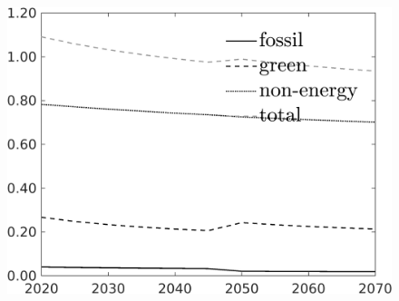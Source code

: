 \begin{figure}[h!!]
\begin{minipage}[]{0.32\textwidth}
	\end{minipage}
	\begin{minipage}[]{0.32\textwidth}
		\includegraphics[width=1\textwidth]{../../codding_model/own_basedOnFried/optimalPol_190722_tidiedUp/figures/all_10Aout22/SingleJointTOT_regime3_OPT_T_NoTaus_Science_spillover0_noskill0_sep1_xgrowth0_extern0_PV1_etaa0.79_lgd1.png}
	\end{minipage}
	\begin{minipage}[]{0.32\textwidth}

\end{minipage}
\end{figure}
